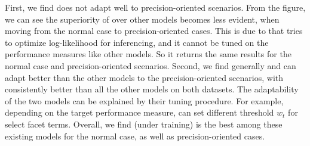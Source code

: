 First, we find \QFJ does not adapt well to precision-oriented scenarios. From the figure, we can see the superiority of \QFJ over other models becomes less evident, when moving from the normal case to precision-oriented cases. This is due to that \QFJ tries to optimize log-likelihood for inferencing, and it cannot be tuned on the performance measures like other models. So it returns the same results for the normal case and precision-oriented scenarios. Second, we find generally \QFI and \QDM can adapt better than the other models to the precision-oriented scenarios, with \QFI consistently better than all the other models on both datasets. The adaptability of the two models can be explained by their tuning procedure. For example, depending on the target performance measure, \QFI can set different threshold $w_t$ for select facet terms. Overall, we find \QFI (under \MLE training) is the best among these existing models for the normal case, as well as precision-oriented cases.
 

